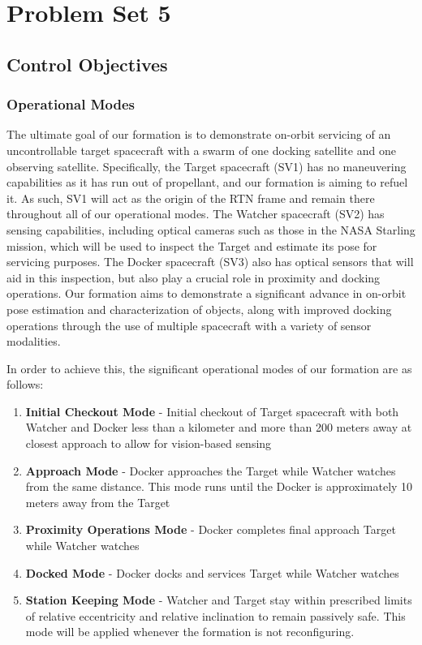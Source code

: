 \section{Problem Set 5}
\subsection{Control Objectives} \label{sec:control_objectives}
\subsubsection{Operational Modes}
The ultimate goal of our formation is to demonstrate on-orbit servicing of an uncontrollable target spacecraft with a swarm of one docking satellite and one observing satellite. Specifically, the Target spacecraft (SV1) has no maneuvering capabilities as it has run out of propellant, and our formation is aiming to refuel it. As such, SV1 will act as the origin of the RTN frame and remain there throughout all of our operational modes. The Watcher spacecraft (SV2) has sensing capabilities, including optical cameras such as those in the NASA Starling mission, which will be used to inspect the Target and estimate its pose for servicing purposes. The Docker spacecraft (SV3) also has optical sensors that will aid in this inspection, but also play a crucial role in proximity and docking operations. Our formation aims to demonstrate a significant advance in on-orbit pose estimation and characterization of objects, along with improved docking operations through the use of multiple spacecraft with a variety of sensor modalities. 

In order to achieve this, the significant operational modes of our formation are as follows: 

\begin{enumerate}
\item \textbf{Initial Checkout Mode} - Initial checkout of Target spacecraft with both Watcher and Docker less than a kilometer and more than 200 meters away at closest approach to allow for vision-based sensing
\item \textbf{Approach Mode} - Docker approaches the Target while Watcher watches from the same distance. This mode runs until the Docker is approximately 10 meters away from the Target
\item \textbf{Proximity Operations Mode} - Docker completes final approach Target while Watcher watches
\item \textbf{Docked Mode} - Docker docks and services Target while Watcher watches
\item \textbf{Station Keeping Mode} - Watcher and Target stay within prescribed limits of relative eccentricity and relative inclination to remain passively safe. This mode will be applied whenever the formation is not reconfiguring. 
\end{enumerate}

